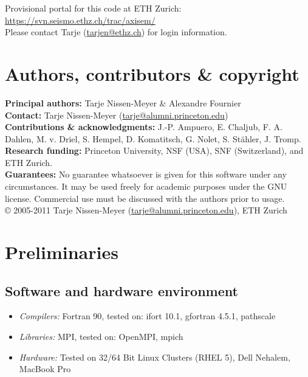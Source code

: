 \documentclass[11pt,letter,fleqn,english,notitlepage]{article}
\begin{document}
\noindent Provisional portal for this code at ETH Zurich:
\url{https://svn.seismo.ethz.ch/trac/axisem/}\\
Please contact Tarje (\url{tarjen@ethz.ch})
for login information.

\section{Authors, contributors \& copyright}
%
\noindent \textbf{Principal authors:} Tarje Nissen-Meyer \& Alexandre Fournier\\
\noindent \textbf{Contact:} Tarje Nissen-Meyer (\url{tarje@alumni.princeton.edu})\\
\noindent \textbf{Contributions \& acknowledgments:}
 J.-P. Ampuero, E. Chaljub, F. A. Dahlen, M. v. Driel, S. Hempel, D. Komatitsch,
 G. Nolet, S. St\"{a}hler, J. Tromp.\\
\noindent \textbf{Research funding:} Princeton University, NSF (USA), SNF (Switzerland), and 
ETH Zurich.\\
\noindent \textbf{Guarantees:} No guarantee whatsoever is given for this software under any circumstances. It may be used freely for 
academic purposes under the GNU license. Commercial use must be
discussed with the authors prior to usage.\\

\noindent \copyright  \hspace*{0.1cm} 
2005-2011 Tarje Nissen-Meyer (\url{tarje@alumni.princeton.edu}), ETH Zurich

\newpage
\tableofcontents
\newpage

\section{Preliminaries}

\subsection{Software and hardware environment}
\begin{itemize}
\item \textit{Compilers:} Fortran 90, tested on: ifort 10.1, gfortran 4.5.1, pathscale
\item \textit{Libraries:} MPI, tested on:  OpenMPI, mpich
\item \textit{Hardware:} Tested on 32/64 Bit Linux Clusters (RHEL 5), Dell Nehalem, MacBook Pro
\end{itemize}
\end{document}
